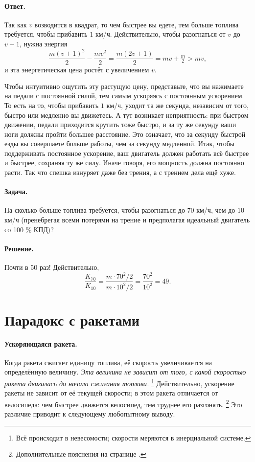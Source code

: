 \paragraph{Ответ.}\label{Ответ:Как почувствовать квадрат}
Так как $v$ возводится в квадрат, то чем быстрее вы едете,
тем больше топлива требуется, чтобы прибавить $1$ км/ч.
Действительно, чтобы разогнаться от $v$ до $v+1$, нужна энергия
\[
\frac{m(v+1)^2}{2} - \frac{mv^2}{2}
   = \frac{m(2v+1)}{2}
   = mv + \tfrac{m}{2} > mv,
\]
и эта энергетическая цена ростёт с увеличением $v$.

Чтобы интуитивно ощутить эту растущую цену, представьте, что вы нажимаете на педали с постоянной силой, тем самым ускоряясь с постоянным ускорением.
То есть на то, чтобы прибавить $1$ км/ч, уходит та же секунда, независим от того, быстро или медленно вы движетесь.
А тут возникает неприятность:
при быстром движении, педали приходится крутить тоже быстро, и за ту же секунду ваши ноги должны пройти большее расстояние.
Это означает, что за секунду быстрой езды вы совершаете больше работы, чем за секунду медленной.
Итак, чтобы поддерживать постоянное ускорение, ваш двигатель должен работать всё быстрее и быстрее, сохраняя ту же силу.
Иначе говоря, его мощность должна постоянно расти.
Так что спешка изнуряет даже без трения, а с трением дела ещё хуже.

\paragraph{Задача.}
На сколько больше топлива требуется,
чтобы разогнаться до $70$ км/ч, чем до $10$ км/ч
(пренебрегая всеми потерями на трение и предполагая идеальный двигатель со 100 \% КПД)?

\paragraph{Решение.}
Почти в $50$ раз!
Действительно,
\[
\frac{K_{70}}{K_{10}}
  = \frac{m \cdot 70^2/2}{m \cdot 10^2/2}
  = \frac{70^2}{10^2}
  = 49.
\]

\section{Парадокс с ракетами}\label{Парадокс с ракетами}

\paragraph{Ускоряющаяся ракета.}
Когда ракета сжигает единицу топлива, её скорость увеличивается на определённую величину.
\emph{Эта величина не зависит от того, с какой скоростью ракета двигалась до начала сжигания топлива.}%
\footnote{Всё происходит в невесомости; скорости меряются в инерциальной системе.}
Действительно, ускорение ракеты не зависит от её текущей скорости;
в этом ракета отличается от велосипеда: чем быстрее движется велосипед, тем труднее его разгонять.%
\footnote{Дополнительные пояснения на странице \pageref{Ответ:Как почувствовать квадрат}.}
Это различие приводит к следующему любопытному выводу.

